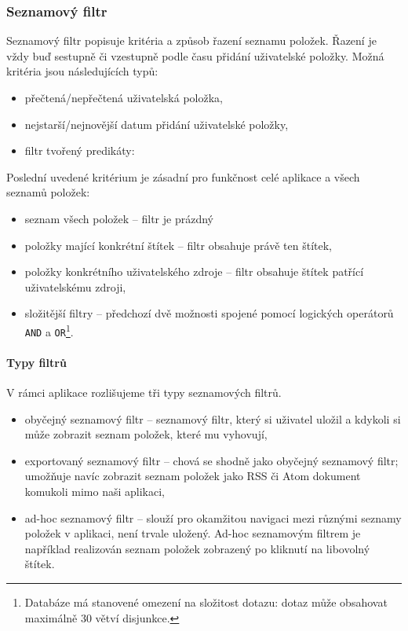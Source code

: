 \subsubsection{Seznamový filtr}

Seznamový filtr popisuje kritéria a způsob řazení seznamu položek.
Řazení je vždy buď sestupně či vzestupně podle času přidání uživatelské položky.
Možná kritéria jsou následujících typů:
\begin{itemize}
	\item přečtená/nepřečtená uživatelská položka,
	\item nejstarší/nejnovější datum přidání uživatelské položky,
	\item filtr tvořený predikáty: 
\end{itemize}

Poslední uvedené kritérium je zásadní pro funkčnost celé aplikace a všech seznamů položek:
\begin{itemize}
	\item seznam všech položek -- filtr je prázdný
	\item položky mající konkrétní štítek -- filtr obsahuje právě ten štítek,
	\item položky konkrétního uživatelského zdroje -- filtr obsahuje štítek patřící uživatelskému zdroji,
	\item složitější filtry -- předchozí dvě možnosti spojené pomocí logických operátorů \verb|AND| a \verb|OR|\footnote{Databáze má stanovené omezení na složitost dotazu: dotaz může obsahovat maximálně 30 větví disjunkce.}.
\end{itemize}

\paragraph{Typy filtrů}
V rámci aplikace rozlišujeme tři typy seznamových filtrů.
\begin{itemize}
	\item obyčejný seznamový filtr -- seznamový filtr, který si uživatel uložil a kdykoli si může zobrazit seznam položek, které mu vyhovují,
	\item exportovaný seznamový filtr -- chová se shodně jako obyčejný seznamový filtr; umožňuje navíc zobrazit seznam položek jako RSS či Atom dokument komukoli mimo naši aplikaci,
	\item ad-hoc seznamový filtr -- slouží pro okamžitou navigaci mezi různými seznamy položek v aplikaci, není trvale uložený.
		Ad-hoc seznamovým filtrem je například realizován seznam položek zobrazený po kliknutí na libovolný štítek.
\end{itemize}

